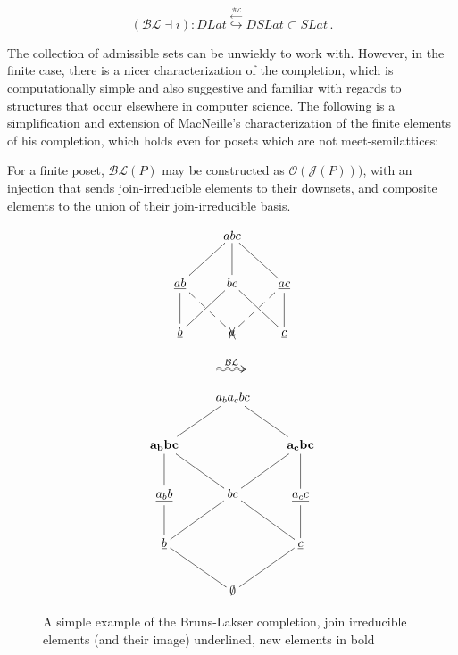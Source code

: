 \documentclass[a4paper,USenglish,cleveref, autoref, thm-restate,authorcolumns]{lipics-v2019}
\newcommand{\Oc}{\mathcal{O}}
\newcommand{\Jc}{\mathcal{J}}
\newcommand{\BLc}{\mathcal{BL}}
\begin{document}
\begin{equation*}
  (\BLc \dashv i) :  DLat \stackrel{\stackrel{\BLc}{\leftarrow}}{\hookrightarrow}
  DSLat \subset SLat
  \,.
\end{equation*}

The collection of admissible sets can be unwieldy to work with. However, in the finite case, there is a nicer characterization of the completion, which is computationally simple and also suggestive and familiar with regards to structures that occur elsewhere in computer science. The following is a simplification and extension of MacNeille's characterization of the finite elements of his completion, which holds even for posets which are not meet-semilattices:

\begin{lemma}
For a finite poset, \(\BLc(P)\) may be constructed as \(\Oc(\Jc(P)))\), with an injection that sends join-irreducible elements to their downsets, and composite elements to the union of their join-irreducible basis.
\end{lemma}



\begin{figure}
\centering
\begin{minipage}[c]{0.3\textwidth}
\begin{equation*}
    \xymatrix{& abc \ar@{-}[dl] \ar@{-}[d] \ar@{-}[dr] & \\
      \underline{ab} \ar@{-}[d] \ar@{--}[dr] & bc \ar@{-}[dl] \ar@{-}[dr] &
        \underline{ac} \ar@{-}[d] \ar@{--}[dl] \\
        \underline{b} & \xcancel{a}  & \underline{c} }         
\end{equation*}
\end{minipage}
\begin{minipage}[c]{0.08\textwidth}
  \begin{equation*}
    \xymatrix{\ar@2{~>}[r]^{\BLc} &}
  \end{equation*}
\end{minipage}
\begin{minipage}[c]{0.3\textwidth}
\begin{equation*}
    \xymatrix{& a_ba_cbc \ar@{-}[dl]  \ar@{-}[dr] & \\
      \mathbf{a_bbc} \ar@{-}[d] \ar@{-}[dr] & &
        \mathbf{a_cbc} \ar@{-}[d] \ar@{-}[dl]\\
        \underline{a_bb} \ar@{-}[d] & bc \ar@{-}[dl] \ar@{-}[dr] &
          \underline{a_cc} \ar@{-}[d] \\
         \underline{b} \ar@{-}[dr] & & \underline{c} \ar@{-}[dl] \\
      & \mathbf{\emptyset} }
\end{equation*}
\end{minipage}
\caption{A simple example of the Bruns-Lakser completion, join irreducible elements (and their image) underlined, new elements in bold}
\label{Fig1}
\end{figure}
\end{document}
